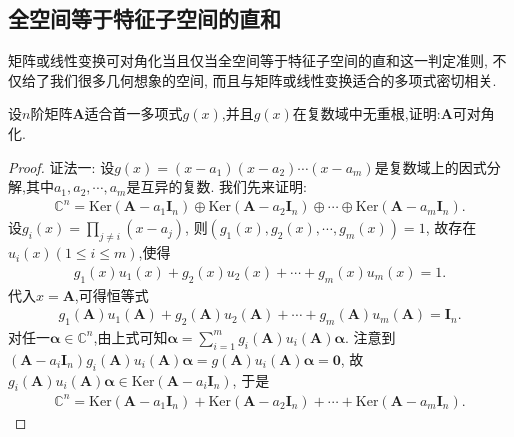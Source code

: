\documentclass[../../main.tex]{subfiles}
\begin{document}
\subsection{全空间等于特征子空间的直和}

矩阵或线性变换可对角化当且仅当全空间等于特征子空间的直和这一判定准则, 不仅给了我们很多几何想象的空间, 而且与矩阵或线性变换适合的多项式密切相关.

\begin{proposition}\label{proposition:适合的多项式无重根则可对角化}
设\(n\)阶矩阵\(\boldsymbol{A}\)适合首一多项式\(g(x)\),并且\(g(x)\)在复数域中无重根,证明:\(\boldsymbol{A}\)可对角化.
\end{proposition}
\begin{proof}
{\color{blue}证法一:}
设\(g(x) = (x - a_1)(x - a_2)\cdots(x - a_m)\)是复数域上的因式分解,其中\(a_1,a_2,\cdots,a_m\)是互异的复数. 我们先来证明:
\begin{align}
\mathbb{C}^n = \mathrm{Ker}(\boldsymbol{A} - a_1\boldsymbol{I}_n)\oplus \mathrm{Ker}(\boldsymbol{A} - a_2\boldsymbol{I}_n)\oplus\cdots\oplus \mathrm{Ker}(\boldsymbol{A} - a_m\boldsymbol{I}_n). \label{proposition0.7-6.5}
\end{align}
设\(g_i(x) = \prod_{j\neq i}(x - a_j)\), 则\((g_1(x),g_2(x),\cdots,g_m(x)) = 1\), 故存在\(u_i(x)(1\leq i\leq m)\),使得
\begin{align*}
g_1(x)u_1(x) + g_2(x)u_2(x) + \cdots + g_m(x)u_m(x) = 1.
\end{align*}
代入\(x = \boldsymbol{A}\),可得恒等式
\begin{align}
g_1(\boldsymbol{A})u_1(\boldsymbol{A}) + g_2(\boldsymbol{A})u_2(\boldsymbol{A}) + \cdots + g_m(\boldsymbol{A})u_m(\boldsymbol{A}) = \boldsymbol{I}_n. \label{proposition0.7-6.6}
\end{align}
对任一\(\boldsymbol{\alpha}\in \mathbb{C}^n\),由上式可知\(\boldsymbol{\alpha} = \sum_{i = 1}^{m}g_i(\boldsymbol{A})u_i(\boldsymbol{A})\boldsymbol{\alpha}\). 注意到\((\boldsymbol{A}-a_i\boldsymbol{I}_n)g_i(\boldsymbol{A})u_i(\boldsymbol{A})\boldsymbol{\alpha} = g(\boldsymbol{A})u_i(\boldsymbol{A})\boldsymbol{\alpha} = \boldsymbol{0}\), 故\(g_i(\boldsymbol{A})u_i(\boldsymbol{A})\boldsymbol{\alpha}\in \mathrm{Ker}(\boldsymbol{A} - a_i\boldsymbol{I}_n)\), 于是
\begin{align}
\mathbb{C}^n = \mathrm{Ker}(\boldsymbol{A} - a_1\boldsymbol{I}_n) + \mathrm{Ker}(\boldsymbol{A} - a_2\boldsymbol{I}_n) + \cdots + \mathrm{Ker}(\boldsymbol{A} - a_m\boldsymbol{I}_n). \label{proposition0.7-6.7}
\end{align}

\end{proof}
\end{document}
